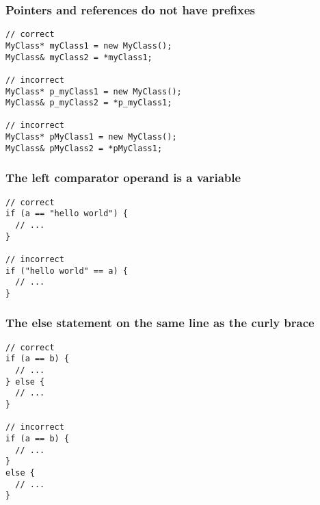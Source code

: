 \subsubsection{Pointers and references do not have prefixes}

\begin{verbatim}
// correct
MyClass* myClass1 = new MyClass();
MyClass& myClass2 = *myClass1;

// incorrect
MyClass* p_myClass1 = new MyClass();
MyClass& p_myClass2 = *p_myClass1;

// incorrect
MyClass* pMyClass1 = new MyClass();
MyClass& pMyClass2 = *pMyClass1;
\end{verbatim}

\subsubsection{The left comparator operand is a variable}

\begin{verbatim}
// correct
if (a == "hello world") {
  // ...
}

// incorrect
if ("hello world" == a) {
  // ...
}
\end{verbatim}

\subsubsection{The else statement on the same line as the curly brace}

\begin{verbatim}
// correct
if (a == b) {
  // ...
} else {
  // ...
}

// incorrect
if (a == b) {
  // ...
}
else {
  // ...
}
\end{verbatim}
